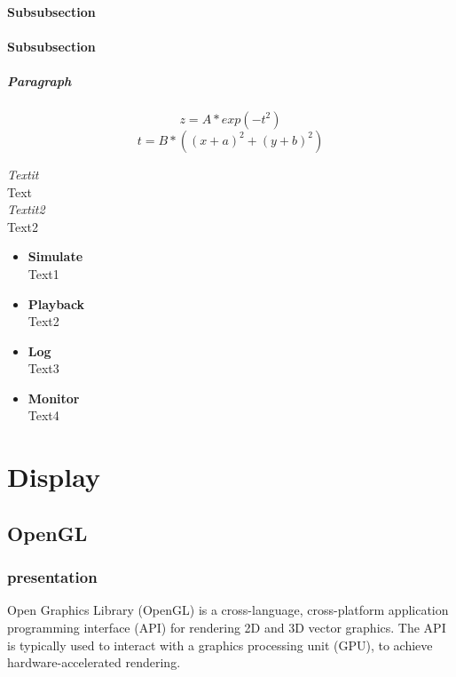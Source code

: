 \documentclass[a4paper]{report}
\begin{document}
\subsubsection{Subsubsection}
\subsubsection{Subsubsection}

\paragraph{Paragraph}

	\begin{equation}
		z = A*exp(-t^2)
	\end{equation}
	\begin{equation}
		t = B*((x+a)^2 + (y+b)^2)
	\end{equation}


	\textit{Textit}\\
	Text \\

	\textit{Textit2}\\
	Text2 \\

\vspace{2cm}

	\begin{itemize}
		\item \textbf{Simulate}\\
			Text1
		\item \textbf{Playback}\\
			Text2
		\item \textbf{Log}\\
			Text3
		\item \textbf{Monitor}\\
			Text4
	\end{itemize}
    
\chapter{Display}
\section{OpenGL}
\subsection{presentation}

Open Graphics Library (OpenGL) is a cross-language, cross-platform application programming interface (API) for rendering 2D and 3D vector graphics. The API is typically used to interact with a graphics processing unit (GPU), to achieve hardware-accelerated rendering.
\end{document}
